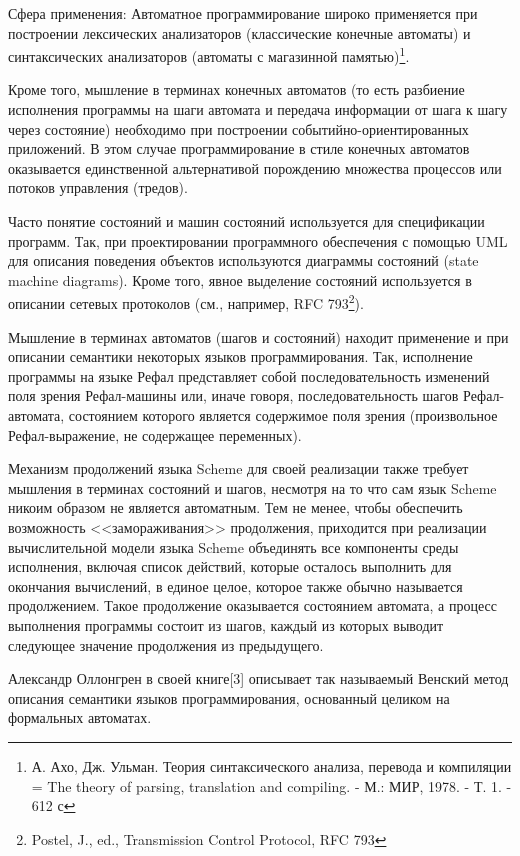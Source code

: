 \documentclass[12pt, twoside]{report}
\begin{document}
Сфера применения:
Автоматное программирование широко применяется при построении лексических анализаторов (классические конечные автоматы) и синтаксических анализаторов (автоматы с магазинной памятью)\footnote{А. Ахо, Дж. Ульман. Теория синтаксического анализа, перевода и компиляции = The theory of parsing, translation and compiling. - М.: МИР, 1978. - Т. 1. - 612 с}.

Кроме того, мышление в терминах конечных автоматов (то есть разбиение исполнения программы на шаги автомата и передача информации от шага к шагу через состояние) необходимо при построении событийно-ориентированных приложений. В этом случае программирование в стиле конечных автоматов оказывается единственной альтернативой порождению множества процессов или потоков управления (тредов).

Часто понятие состояний и машин состояний используется для спецификации программ. Так, при проектировании программного обеспечения с помощью UML для описания поведения объектов используются диаграммы состояний (state machine diagrams). Кроме того, явное выделение состояний используется в описании сетевых протоколов (см., например, RFC 793\footnote{Postel, J., ed., Transmission Control Protocol, RFC 793}).

Мышление в терминах автоматов (шагов и состояний) находит применение и при описании семантики некоторых языков программирования. Так, исполнение программы на языке Рефал представляет собой последовательность изменений поля зрения Рефал-машины или, иначе говоря, последовательность шагов Рефал-автомата, состоянием которого является содержимое поля зрения (произвольное Рефал-выражение, не содержащее переменных).

Механизм продолжений языка Scheme для своей реализации также требует мышления в терминах состояний и шагов, несмотря на то что сам язык Scheme никоим образом не является автоматным. Тем не менее, чтобы обеспечить возможность <<замораживания>> продолжения, приходится при реализации вычислительной модели языка Scheme объединять все компоненты среды исполнения, включая список действий, которые осталось выполнить для окончания вычислений, в единое целое, которое также обычно называется продолжением. Такое продолжение оказывается состоянием автомата, а процесс выполнения программы состоит из шагов, каждый из которых выводит следующее значение продолжения из предыдущего.

Александр Оллонгрен в своей книге[3] описывает так называемый Венский метод описания семантики языков программирования, основанный целиком на формальных автоматах.
\end{document}
